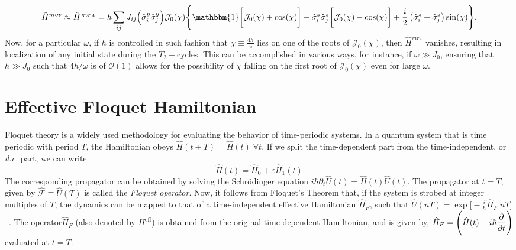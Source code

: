 \documentclass[%
nofootinbib,
reprint,
superscriptaddress,
amsmath,amssymb,showkeys,
aps,
prb,
]{revtex4-2}
\begin{document}
	\begin{equation}
		\hat{H}^{mov}\approx \hat{H}^{_{RWA}} = \hbar\sum_{ij} J_{ij} \Big(\hat{\sigma}^y_i\hat{\sigma}^y_j\Big) \mathcal{J}_0(\chi)\Bigg\{\mathbbm{1}\bigg[\mathcal{J}_0(\chi) + \cos(\chi)\bigg] -\hat{\sigma}^z_i\hat{\sigma}^z_j \bigg[\mathcal{J}_0(\chi) - \cos(\chi)\bigg] + \frac{i}{2} \left(\hat{\sigma}^z_i + \hat{\sigma}^z_j\right) \sin(\chi)\Bigg\}.
		\label{eq:hrwa}
	\end{equation}	
	Now, for a particular $\omega$, if $h$ is controlled in such fashion that $\chi\equiv\frac{4h}{\omega}$ lies on one of the roots of $\mathcal{J}_0(\chi)$, then $\hat{H}^{_{RWA}}$ vanishes, resulting in localization of any initial state during the $T_2-$cycles. This can be accomplished in various ways, for instance, if $\omega\gg J_0$, ensuring that $h\gg J_0$ such that $4h/\omega$ is of $\mathcal{O}(1)$ allows for the possibility of $\chi$ falling on the first root of $\mathcal{J}_0(\chi)$ even for large $\omega$.
	
	\section{\label{sec:AppendixB} Effective Floquet Hamiltonian}
	
	Floquet theory is a widely used methodology for evaluating the behavior of time-periodic systems.  In a quantum system that is time periodic with period $T$, the Hamiltonian obeys $\hat{H}(t+T) = \hat{H}(t)\;\forall t$. If we split the time-dependent part from the time-independent, or \textit{d.c.} part, we can write
	\begin{equation*}
		\hat{H}(t) = \hat{H}_0 + \varepsilon \hat{H}_1(t)
	\end{equation*}
	The corresponding propagator can be obtained by solving the Schr\"odinger equation $\displaystyle{i\hbar \partial_t \hat{U}(t) = \hat{H}(t) \hat{U}(t)}$.  The propagator at $t=T$, given by $ \hat{\mathcal{F}}\equiv \hat{U}(T)$ is called the \textit{Floquet operator}. Now, it follows from Floquet's Theorem that, if the system is strobed at integer multiples of $T$, the dynamics can be mapped to that of a time-independent effective Hamiltonian $\hat{H}_F$, such that  $\displaystyle\hat{U}(nT) = \exp\bigg[-\frac{i}{\hbar}\hat{H}_F\; nT \bigg]$~\cite{Eckardt_2015}.  The operator$\hat{H}_F$ (also denoted by $H^\mathrm{eff}$) is obtained from the original time-dependent Hamiltonian, and is given by, $\displaystyle \hat{H}_F = \Bigg(\hat{H}(t) - i\hbar \pdv{t}\Bigg)$ evaluated at $t=T$. 
	
\end{document}
